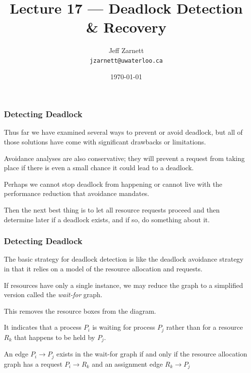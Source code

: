 

\title{Lecture 17 --- Deadlock Detection \& Recovery }

\author{Jeff Zarnett \\ \small \texttt{jzarnett@uwaterloo.ca}}
\date{\today}




\begin{frame}
  \titlepage

 \end{frame}


\begin{frame}
\frametitle{Detecting Deadlock}

Thus far we have examined several ways to prevent or avoid deadlock, but all of those solutions have come with significant drawbacks or limitations. 

Avoidance analyses are also conservative; they will prevent a request from taking place if there is even a small chance it could lead to a deadlock. 

Perhaps we cannot stop deadlock from happening or cannot live with the performance reduction that avoidance mandates.

Then the next best thing is to let all resource requests proceed and then determine later if a deadlock exists, and if so, do something about it.

\end{frame}


\begin{frame}
\frametitle{Detecting Deadlock}

The basic strategy for deadlock detection is like the deadlock avoidance strategy in that it relies on a model of the resource allocation and requests. 

If resources have only a single instance, we may reduce the graph to a simplified version called the \textit{wait-for} graph. 

This removes the resource boxes from the diagram.

It indicates that a process $P_{i}$ is waiting for process $P_{j}$ rather than for a resource $R_{k}$ that happens to be held by $P_{j}$. 

An edge $P_{i} \rightarrow P_{j}$ exists in the wait-for graph if and only if the resource allocation graph has a request $P_{i} \rightarrow R_{k}$ and an assignment edge $R_{k} \rightarrow P_{j}$

\end{frame}

